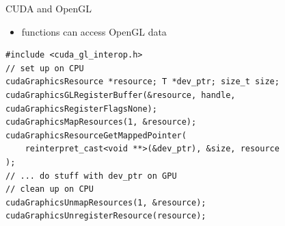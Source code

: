 \begin{frame}[fragile]{CUDA and OpenGL}
    \center
    \begin{itemize}
        \item<1->  functions can access OpenGL data
    \end{itemize}
    \begin{verbatim}
#include <cuda_gl_interop.h>
// set up on CPU
cudaGraphicsResource *resource; T *dev_ptr; size_t size;
cudaGraphicsGLRegisterBuffer(&resource, handle, cudaGraphicsRegisterFlagsNone);
cudaGraphicsMapResources(1, &resource);
cudaGraphicsResourceGetMappedPointer(
    reinterpret_cast<void **>(&dev_ptr), &size, resource
);
// ... do stuff with dev_ptr on GPU
// clean up on CPU
cudaGraphicsUnmapResources(1, &resource);
cudaGraphicsUnregisterResource(resource);
    \end{verbatim}
\end{frame}